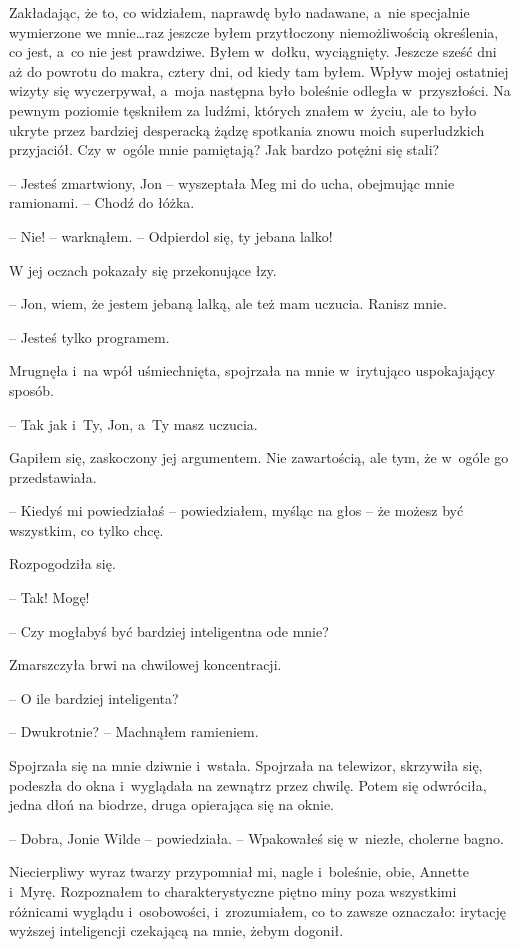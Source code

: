 \documentclass[oneside,polish,11pt,sfheadings]{mwbk}
\begin{document}
Zakładając, że to, co widziałem, naprawdę było nadawane, a~nie
specjalnie wymierzone we mnie\ldots raz jeszcze byłem przytłoczony
niemożliwością określenia, co jest, a~co nie jest prawdziwe. Byłem w~dołku, wyciągnięty. Jeszcze sześć dni aż do powrotu do makra, cztery
dni, od kiedy tam byłem. Wpływ mojej ostatniej wizyty się wyczerpywał, a~moja następna było boleśnie odległa w~przyszłości. Na pewnym poziomie
tęskniłem za ludźmi, których znałem w~życiu, ale to było ukryte przez
bardziej desperacką żądzę spotkania znowu moich superludzkich
przyjaciół. Czy w~ogóle mnie pamiętają? Jak bardzo potężni się stali?

-- Jesteś zmartwiony, Jon -- wyszeptała Meg mi do ucha, obejmując mnie
ramionami. -- Chodź do łóżka.

-- Nie! -- warknąłem. -- Odpierdol się, ty jebana lalko!

W jej oczach pokazały się przekonujące łzy.

-- Jon, wiem, że jestem jebaną lalką, ale też mam uczucia. Ranisz mnie.

-- Jesteś tylko programem.

Mrugnęła i~na wpół uśmiechnięta, spojrzała na mnie w~irytująco
uspokajający sposób. 

-- Tak jak i~Ty, Jon, a~Ty masz uczucia.

Gapiłem się, zaskoczony jej argumentem. Nie zawartością, ale tym, że w~ogóle go przedstawiała.

-- Kiedyś mi powiedziałaś -- powiedziałem, myśląc na głos -- że możesz być
wszystkim, co tylko chcę.

Rozpogodziła się. 

-- Tak! Mogę!

-- Czy mogłabyś być bardziej inteligentna ode mnie?

Zmarszczyła brwi na chwilowej koncentracji. 

-- O ile bardziej inteligenta?

-- Dwukrotnie? -- Machnąłem ramieniem.

Spojrzała się na mnie dziwnie i~wstała. Spojrzała na telewizor,
skrzywiła się, podeszła do okna i~wyglądała na zewnątrz przez chwilę.
Potem się odwróciła, jedna dłoń na biodrze, druga opierająca się na
oknie.

-- Dobra, Jonie Wilde -- powiedziała. -- Wpakowałeś się w~niezłe, cholerne
bagno.

Niecierpliwy wyraz twarzy przypomniał mi, nagle i~boleśnie, obie,
Annette i~Myrę. Rozpoznałem to charakterystyczne piętno miny poza
wszystkimi różnicami wyglądu i~osobowości, i~zrozumiałem, co to zawsze
oznaczało: irytację wyższej inteligencji czekającą na mnie, żebym
dogonił.
\end{document}
